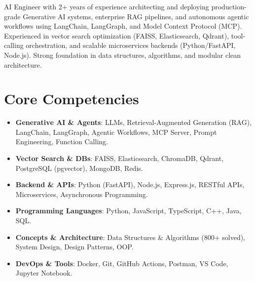 \documentclass[11pt,a4paper,sans]{moderncv}
\begin{document}
\makecvtitle


\vspace{3pt}
\small{AI Engineer with 2+ years of experience architecting and deploying production-grade Generative AI systems, enterprise RAG pipelines, and autonomous agentic workflows using LangChain, LangGraph, and Model Context Protocol (MCP). Experienced in vector search optimization (FAISS, Elasticsearch, Qdrant), tool-calling orchestration, and scalable microservices backends (Python/FastAPI, Node.js). Strong foundation in data structures, algorithms, and modular clean architecture.}


\section{Core Competencies}
\vspace{1pt}
\begin{itemize}
\item \textbf{Generative AI \& Agents}: LLMs, Retrieval-Augmented Generation (RAG), LangChain, LangGraph, Agentic Workflows, MCP Server, Prompt Engineering, Function Calling.
\item \textbf{Vector Search \& DBs}: FAISS, Elasticsearch, ChromaDB, Qdrant, PostgreSQL (pgvector), MongoDB, Redis.
\item \textbf{Backend \& APIs}: Python (FastAPI), Node.js, Express.js, RESTful APIs, Microservices, Asynchronous Programming.
\item \textbf{Programming Languages}: Python, JavaScript, TypeScript, C++, Java, SQL.
\item \textbf{Concepts \& Architecture}: Data Structures \& Algorithms (800+ solved), System Design, Design Patterns, OOP.
\item \textbf{DevOps \& Tools}: Docker, Git, GitHub Actions, Postman, VS Code, Jupyter Notebook.
\end{itemize}

\end{document}
